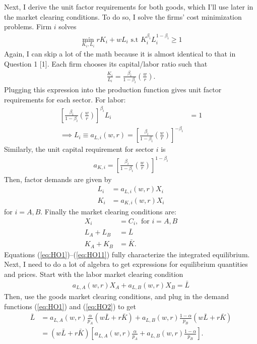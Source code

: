 \documentclass[12pt]{article}
\begin{document}
Next, I derive the unit factor requirements for both goods, which I'll use later in the market clearing conditions. To do so, I solve the firms' cost minimization problems. Firm $i$ solves
\begin{align*}
\min_{K_i,L_i} rK_i + wL_i \text{ s.t } K_i^{\beta_i}L_i^{1-\beta_i} \geq 1
\end{align*}
Again, I can skip a lot of the math because it is almost identical to that in Question 1 [1]. Each firm chooses its capital/labor ratio such that
\begin{align*}
\frac{K_i}{L_i} = \frac{\beta_i}{1-\beta_i}\left(\frac{w}{r}\right).
\end{align*}
Plugging this expression into the production function gives unit factor requirements for each sector. For labor:
\begin{align}
\left[ \frac{\beta_i}{1-\beta_i}\left(\frac{w}{r}\right)\right]^{\beta_i} L_i &= 1 \nonumber \\
\implies L_i \equiv a_{L,i}(w,r) =  \left[ \frac{\beta_i}{1-\beta_i}\left(\frac{w}{r}\right)\right]^{-\beta_i} \label{eq:HO5}
\end{align}
Similarly, the unit capital requirement for sector $i$ is
\begin{align}
a_{K,i} =  \left[ \frac{\beta_i}{1-\beta_i}\left(\frac{w}{r}\right)\right]^{1-\beta_i} \label{eq:HO6}
\end{align}
Then, factor demands are given by
\begin{align}
L_i &= a_{L,i}(w,r) X_i \label{eq:HO7}\\
K_i &= a_{K,i}(w,r) X_i \label{eq:HO8}
\end{align}
for $i = A,B$. Finally the market clearing conditions are:
\begin{align}
X_i &= C_i, \text{ for } i = A,B  \label{eq:HO9}\\
L_A + L_B &= \bar L \label{eq:HO10}\\
K_A + K_B &= \bar K. \label{eq:HO11}
\end{align}
Equations (\ref{eq:HO1})--(\ref{eq:HO11}) fully characterize the integrated equilibrium. Next, I need to do a lot of algebra to get expressions for equilibrium quantities and prices. Start with the labor market clearing condition
\begin{align*}
a_{L,A}(w,r) X_A+ a_{L,B}(w,r) X_B =\bar L
\end{align*}
Then, use the goods market clearing conditions, and plug in the demand functions (\ref{eq:HO1}) and (\ref{eq:HO2}) to get
\begin{align*}
 \bar L&=a_{L,A}(w,r) \frac{\alpha}{p_A}(w\bar L + r\bar K) + a_{L,B}(w,r)\frac{1-\alpha}{p_B}(w\bar L + r\bar K) \\
 &=(w\bar L + r\bar K)\left[a_{L,A}(w,r) \frac{\alpha}{p_A} + a_{L,B}(w,r)\frac{1-\alpha}{p_B}\right].
\end{align*}
\end{document}
